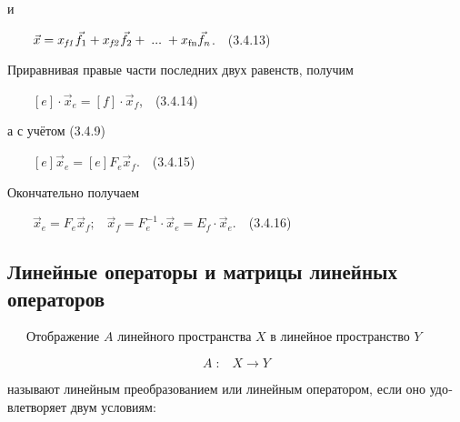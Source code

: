 \documentclass[a4paper]{article}
\newcommand\normalsubformula[1]{\text{\mathversion{normal}$#1$}}
\begin{document}
{\begin{russian}\sffamily
и
\end{russian}}

{\begin{russian}\sffamily
\ \ \ \  $\vec x=x_{\mathit{f1}}\vec f_1+x_{\mathit{f2}}\vec f_2+\;...\;+x_{\normalsubformula{\text{fn}}}\vec
f_n$.\ \ (3.4.13)
\end{russian}}

{\begin{russian}\sffamily
Приравнивая правые части последних двух равенств, получим
\end{russian}}

{\begin{russian}\sffamily
\ \ \ \  $\left[e\right]\cdot \vec x_e=\left[f\right]\cdot \vec x_f$,\ \ (3.4.14)
\end{russian}}

{\begin{russian}\sffamily
а с учётом (3.4.9)
\end{russian}}

{\begin{russian}\sffamily
\ \ \ \  $[e]\vec x_e=\left[e\right]F_e\vec x_f$.\ \ (3.4.15)
\end{russian}}

{\begin{russian}\sffamily
Окончательно получаем
\end{russian}}

{\begin{russian}\sffamily
\ \ \ \  $\vec x_e=F_e\vec x_f;$ \  $\vec x_f=F_e^{-1}\cdot \vec x_e=E_f\cdot \vec x_e$.\ \ (3.4.16)
\end{russian}}


\bigskip

\subsection[Линейные операторы и матрицы линейных операторов]{Линейные операторы и матрицы линейных операторов}
\hypertarget{RefHeadingToc455659735}{}{\begin{russian}\sffamily
\ \ \ Отображение  $A$\textrm{ }линейного пространства  $X$ в линейное пространство  $Y$
\end{russian}}

\begin{equation*}
A\;:\;\;\;X\rightarrow Y
\end{equation*}
{\begin{russian}\sffamily
называют линейным преобразованием или линейным оператором, если оно удовлетворяет двум условиям:
\end{russian}}
\end{document}

